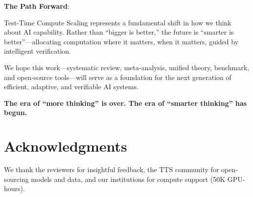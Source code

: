 \documentclass[10pt,preprint]{neurips_2024}
\begin{document}
\textbf{The Path Forward}:

Test-Time Compute Scaling represents a fundamental shift in how we think about AI capability. Rather than ``bigger is better,'' the future is ``smarter is better''---allocating computation where it matters, when it matters, guided by intelligent verification.

We hope this work---systematic review, meta-analysis, unified theory, benchmark, and open-source tools---will serve as a foundation for the next generation of efficient, adaptive, and verifiable AI systems.

\textbf{The era of ``more thinking'' is over. The era of ``smarter thinking'' has begun.}

\section*{Acknowledgments}

We thank the reviewers for insightful feedback, the TTS community for open-sourcing models and data, and our institutions for compute support (50K GPU-hours).
\end{document}
